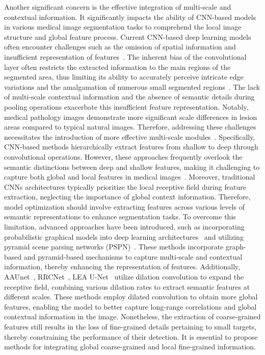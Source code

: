 \documentclass[review]{elsarticle}
\begin{document}
	Another significant concern is the effective integration of multi-scale and contextual information. It significantly impacts the ability of CNN-based models in various medical image segmentation tasks to comprehend the local image structure and global feature process. Current CNN-based deep learning models often encounter challenges such as the omission of spatial information and insufficient representation of features~\cite{yu2015multi}. The inherent bias of the convolutional layer often restricts the extracted information to the main regions of the segmented area, thus limiting its ability to accurately perceive intricate edge variations and the amalgamation of numerous small segmented regions~\cite{Lv2023Local}. The lack of multi-scale contextual information and the absence of semantic details during pooling operations exacerbate this insufficient feature representation. Notably, medical pathology images demonstrate more significant scale differences in lesion areas compared to typical natural images. Therefore, addressing these challenges necessitates the introduction of more effective multi-scale modules~\cite{srivastava2021msrf}. Specifically, CNN-based methods hierarchically extract features from shallow to deep through convolutional operations. However, these approaches frequently overlook the semantic distinctions between deep and shallow features, making it challenging to capture both global and local features in medical images~\cite{li2022global}. Moreover, traditional CNNs architectures typically prioritize the local receptive field during feature extraction, neglecting the importance of global context information. Therefore, model optimization should involve extracting features across various levels of semantic representations to enhance segmentation tasks. To overcome this limitation, advanced approaches have been introduced, such as incorporating probabilistic graphical models into deep learning architectures~\cite{zheng2015conditional} and utilizing pyramid scene parsing networks (PSPN)~\cite{zhao2017pyramid}. These methods incorporate graph-based and pyramid-based mechanisms to capture multi-scale and contextual information, thereby enhancing the representation of features. Additionally, AAUnet~\cite{chen2022aau}, RRCNet~\cite{chen2023rrcnet}, LEA U-Net~\cite{ouyang2023lea} utilize dilation convolution to expand the receptive field, combining various dilation rates to extract semantic features at different scales. These methods employ dilated convolution to obtain more global features, enabling the model to better capture long-range correlations and global contextual information in the image. Nonetheless, the extraction of coarse-grained features still results in the loss of fine-grained details pertaining to small targets, thereby constraining the performance of their detection. It is essential to propose methods for integrating global coarse-grained and local fine-grained information.
\end{document}
